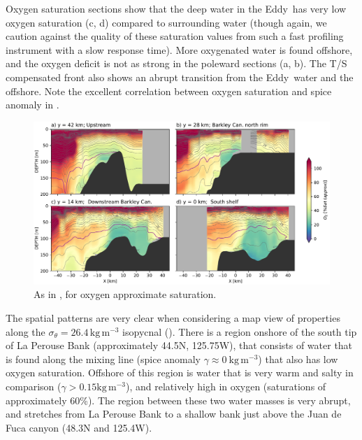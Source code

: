 \documentclass[draft]{agujournal2019}
\newcommand*{\Eddy}{{\sc Eddy}}
\begin{document}
Oxygen saturation sections show that the deep water in the  \Eddy\ has very low oxygen saturation (c, d) compared to surrounding water (though again, we caution against the quality of these saturation values from such a fast profiling instrument with a slow response time).  More oxygenated water is found offshore, and the oxygen deficit is not as strong in the poleward sections (a, b).  The T/S compensated front also shows an abrupt transition from the \Eddy\ water and the offshore. Note the excellent correlation between oxygen saturation and spice anomaly in .

\begin{figure}[htbp]
  \begin{center}
    \includegraphics[width=6.2in]{CrossSectionsO2}
    \caption{As in , for oxygen approximate saturation.
      \label{fig:CrossSectionsO2} }
  \end{center}
\end{figure}

The spatial patterns are very clear when considering a map view of properties along the $\sigma_{\theta} = 26.4\,\mathrm{kg\,m^{-3}}$ isopycnal ().  There is a region onshore of the south tip of La Perouse Bank (approximately 44.5\textdegree N, 125.75\textdegree W), that consists of water that is found along the mixing line (spice anomaly $\gamma \approx 0\ \mathrm{kg\,m^{-3}}$) that also has low oxygen saturation.  Offshore of this region is water that is very warm and salty in comparison ($\gamma > 0.15 \mathrm{kg\,m^{-3}}$), and relatively high in oxygen (saturations of approximately 60\%).  The region between these two water masses is very abrupt, and  stretches from La Perouse Bank to a shallow bank just above the Juan de Fuca canyon (48.3\textdegree N and 125.4\textdegree W).
\end{document}

